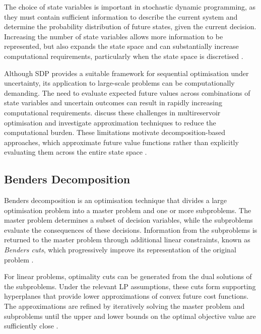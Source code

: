 The choice of state variables is important in stochastic dynamic programming, as they must contain sufficient information to describe the current system and determine the probability distribution of future states, given the current decision. Increasing the number of state variables allows more
information to be represented, but also expands the state
space and can substantially increase computational
requirements, particularly when the state space is discretised
\parencite[p.~674]{yakowitz1982}.

Although SDP provides a suitable framework for sequential optimisation under uncertainty, its application to large-scale problems can be computationally demanding. The need to evaluate expected future values across combinations of state variables and uncertain outcomes can result in rapidly increasing computational requirements. \textcite{cervellera2006} discuss these challenges in multireservoir optimisation and investigate approximation techniques to reduce the computational burden. %
These limitations motivate decomposition-based approaches, which approximate future value functions rather than explicitly evaluating them across the entire state space \parencite{pereiraPinto1991}.


\subsection{Benders Decomposition}
\label{subsec:benders_decomposition}

Benders decomposition is an optimisation technique that
divides a large optimisation problem into a master problem
and one or more subproblems. The master problem determines
a subset of decision variables, while the subproblems
evaluate the consequences of these decisions. Information
from the subproblems is returned to the master problem
through additional linear constraints, known as
\textit{Benders cuts}, which progressively improve its
representation of the original problem
\parencite{benders1962}.

For linear problems, optimality cuts
can be generated from the dual solutions of the
subproblems. Under the relevant LP assumptions,
these cuts form supporting hyperplanes that provide
lower approximations of convex future cost functions.
The approximations are refined by iteratively solving
the master problem and subproblems until the upper
and lower bounds on the optimal objective value are
sufficiently close
\parencite[pp.~361--364]{pereiraPinto1991}.

